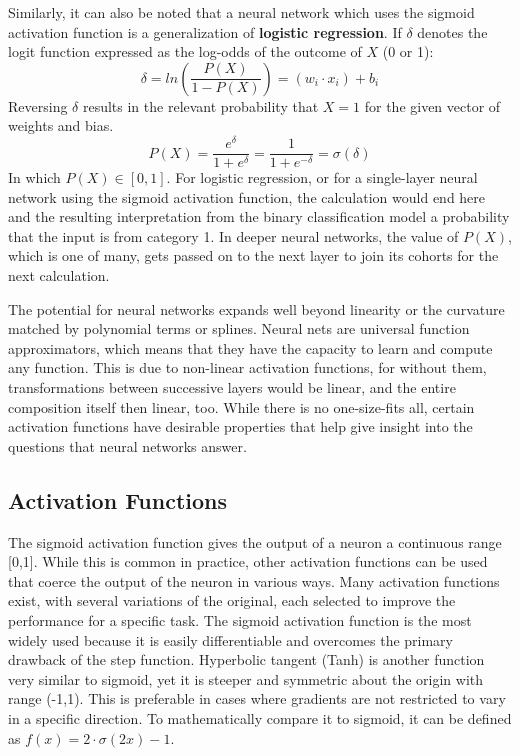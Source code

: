 Similarly, it can also be noted that a neural network which uses the sigmoid activation function is a generalization of \textbf{logistic regression}. \cite{dreiseitl2002logistic} \cite{schumacher1996neural}  If $\delta$ denotes the logit function expressed as the log-odds of the outcome of $X$ (0 or 1):
$$
\delta = ln \left( \frac{P(X)}{1-P(X)} \right) = (w_i \cdot x_i) + b_i 
$$
Reversing $\delta$ results in the relevant probability that $X = 1$ for the given vector of weights and bias.
$$
P(X) = \frac{e^\delta}{1+e^\delta} = \frac{1}{1+e^{-\delta}} = \sigma(\delta)
$$
In which $P(X) \in [0,1]$.  For logistic regression, or for a single-layer neural network using the sigmoid activation function, the calculation would end here and the resulting interpretation from the binary classification model a probability that the input is from category 1.  In deeper neural networks, the value of $P(X)$, which is one of many, gets passed on to the next layer to join its cohorts for the next calculation.

The potential for neural networks expands well beyond linearity or the curvature matched by polynomial terms or splines.  Neural nets are universal function approximators, which means that they have the capacity to learn and compute any function. \cite{sharma2017activation} This is due to non-linear activation functions, for without them, transformations between successive layers would be linear, and the entire composition itself then linear, too. \cite{bishop1995}  While there is no one-size-fits all, certain activation functions have desirable properties that help give insight into the questions that neural networks answer.





\hypertarget{activation-functions}{%
\subsection{Activation Functions}\label{activation-functions}}

The sigmoid activation function gives the output of a neuron a continuous range [0,1].  While this is common in practice, other activation functions can be used that coerce the output of the neuron in various ways.
Many activation functions exist, with several variations of the original, each selected to improve the performance for a specific task.  The sigmoid activation function is the most widely used because it is easily differentiable and overcomes the primary drawback of the step function.  Hyperbolic tangent (Tanh) is another function very similar to sigmoid, yet it is steeper and symmetric about the origin with range (-1,1).  This is preferable in cases where gradients are not restricted to vary in a specific direction.  To mathematically compare it to sigmoid, it can be defined as $f(x) = 2 \cdot  \sigma(2x) - 1$.



